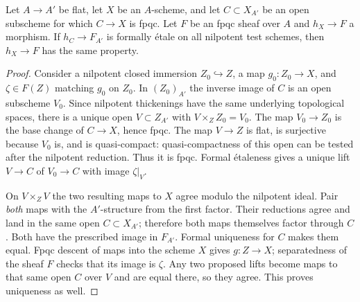 \begin{lemma}
\label{A:fpqc-open-formal-descent}
Let $A\to A'$ be flat, let $X$ be an $A$-scheme, and let
$C\subset X_{A'}$ be an open subscheme for which $C\to X$ is
fpqc.  Let $F$ be an fpqc sheaf over $A$ and $h_X\to F$ a
morphism.  If $h_C\to F_{A'}$ is formally \'etale on all
nilpotent test schemes, then $h_X\to F$ has the same property.
\end{lemma}
\begin{proof}
Consider a nilpotent closed immersion $Z_0\hookrightarrow Z$,
a map $g_0:Z_0\to X$, and $\zeta\in F(Z)$ matching $g_0$
on $Z_0$.  In $(Z_0)_{A'}$ the inverse image of $C$ is an open
subscheme $V_0$.  Since nilpotent thickenings have the same
underlying topological spaces, there is a unique open
$V\subset Z_{A'}$ with $V\times_ZZ_0=V_0$.
The map $V_0\to Z_0$ is the base change of $C\to X$, hence
fpqc.  The map $V\to Z$ is flat, is surjective because $V_0$
is, and is quasi-compact: quasi-compactness of this open can be
tested after the nilpotent reduction.  Thus it is fpqc.
Formal \'etaleness gives a unique lift $V\to C$ of $V_0\to C$
with image $\zeta|_V$.

On $V\times_ZV$ the two resulting maps to $X$ agree modulo
the nilpotent ideal.  Pair \emph{both} maps with the $A'$-structure
from the first factor.  Their reductions agree and land in the
same open $C\subset X_{A'}$; therefore both maps themselves
factor through $C$.  Both have the prescribed image in $F_{A'}$.
Formal uniqueness for $C$ makes them equal.  Fpqc descent of
maps into the scheme $X$ gives $g:Z\to X$; separatedness of the
sheaf $F$ checks that its image is $\zeta$.  Any two proposed
lifts become maps to that same open $C$ over $V$ and are equal
there, so they agree.  This proves uniqueness as well.
\end{proof}

